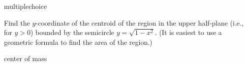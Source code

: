 \documentclass{ximera}
\begin{document}
\begin{question}[2016C.02]
\begin{type}
multiplechoice
\end{type}
Find the \(y\)-coordinate of the centroid of the region in the upper half-plane (i.e., for \(y > 0\)) bounded by the semicircle \(y = \sqrt{1-x^2}\). (It is easiest to use a geometric formula to find the area of the region.)
\begin{multiplechoice}
\end{multiplechoice}
\begin{keywords}
center of mass
\end{keywords}
\end{question}
\end{document}
